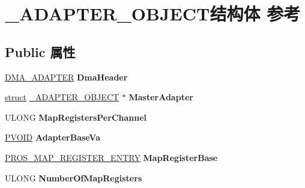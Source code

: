 \hypertarget{struct___a_d_a_p_t_e_r___o_b_j_e_c_t}{}\section{\+\_\+\+A\+D\+A\+P\+T\+E\+R\+\_\+\+O\+B\+J\+E\+C\+T结构体 参考}
\label{struct___a_d_a_p_t_e_r___o_b_j_e_c_t}
\subsection*{Public 属性}
\begin{DoxyCompactItemize}
\item 
\mbox{\label{struct___a_d_a_p_t_e_r___o_b_j_e_c_t_a16aaa43efb716fb57548e5c6759cc0ee}} 
\hyperlink{struct___d_m_a___a_d_a_p_t_e_r}{D\+M\+A\+\_\+\+A\+D\+A\+P\+T\+ER} {\bfseries Dma\+Header}
\item 
\mbox{\label{struct___a_d_a_p_t_e_r___o_b_j_e_c_t_a3f0f4cd6f7b218b28d4a3f18dbd5a471}} 
\hyperlink{interfacestruct}{struct} \hyperlink{struct___a_d_a_p_t_e_r___o_b_j_e_c_t}{\+\_\+\+A\+D\+A\+P\+T\+E\+R\+\_\+\+O\+B\+J\+E\+CT} $\ast$ {\bfseries Master\+Adapter}
\item 
\mbox{\label{struct___a_d_a_p_t_e_r___o_b_j_e_c_t_aa7b8fab12cfd9a216bc960c30b23fc85}} 
U\+L\+O\+NG {\bfseries Map\+Registers\+Per\+Channel}
\item 
\mbox{\label{struct___a_d_a_p_t_e_r___o_b_j_e_c_t_aa1f6660093a85ce55b11201374334583}} 
\hyperlink{interfacevoid}{P\+V\+O\+ID} {\bfseries Adapter\+Base\+Va}
\item 
\mbox{\label{struct___a_d_a_p_t_e_r___o_b_j_e_c_t_a1a652fd848b0d19e5e00229ce5316b07}} 
\hyperlink{struct___r_o_s___m_a_p___r_e_g_i_s_t_e_r___e_n_t_r_y}{P\+R\+O\+S\+\_\+\+M\+A\+P\+\_\+\+R\+E\+G\+I\+S\+T\+E\+R\+\_\+\+E\+N\+T\+RY} {\bfseries Map\+Register\+Base}
\item 
\mbox{\label{struct___a_d_a_p_t_e_r___o_b_j_e_c_t_aa3c540518891d651cd43ca9c3b949889}} 
U\+L\+O\+NG {\bfseries Number\+Of\+Map\+Registers}

\end{DoxyCompactItemize}
